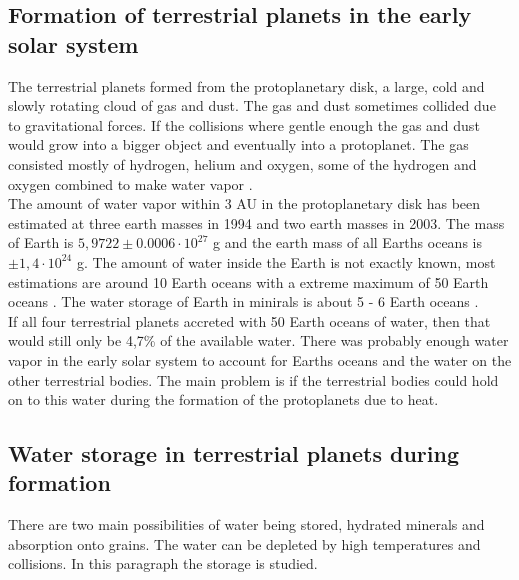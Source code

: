 \subsection{Formation of terrestrial planets in the early solar system}
The terrestrial planets formed from the protoplanetary disk, a large, cold and slowly rotating cloud of gas and dust. The gas and dust sometimes collided due to gravitational forces. If the collisions where gentle enough the gas and dust would grow into a bigger object and eventually into a protoplanet. The gas consisted mostly of hydrogen, helium and oxygen, some of the hydrogen and oxygen combined to make water vapor \cite[p.~523]{TPoriginWater}.\\

The amount of water vapor within 3 AU in the protoplanetary disk has been estimated at three earth masses \cite{TPLecluse} in 1994 and two earth masses \cite{TPPalme} \cite{TPLodders} in 2003. The mass of Earth is $5,9722 \pm 0.0006 \cdot 10^{27}$ g and the earth mass of all Earths oceans is $\pm 1,4 \cdot 10^{24}$ g. The amount of water inside the Earth is not exactly known, most estimations are around 10 Earth oceans with a extreme maximum of 50 Earth oceans \cite[p.~523]{TPoriginWater}. The water storage of Earth in minirals is about 5 - 6 Earth oceans \cite{TPOhtani}.\\

If all four terrestrial planets accreted with 50 Earth oceans of water, then that would still only be 4,7\% of the available water. There was probably enough water vapor in the early solar system to account for Earths oceans and the water on the other terrestrial bodies. The main problem is if the terrestrial bodies could hold on to this water during the formation of the protoplanets due to heat.


\subsection{Water storage in terrestrial planets during formation}
There are two main possibilities of water being stored, hydrated minerals and absorption onto grains. The water can be depleted by high temperatures and collisions. In this paragraph the storage is studied. \\


